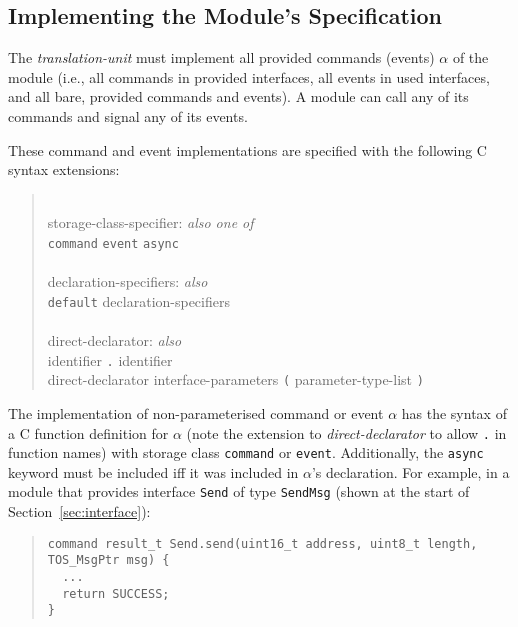 \documentclass[11pt,letterpaper]{article}
\newcommand{\kw}[1]{{\tt #1}}
\newcommand{\code}[1]{{\tt #1}}
\newcommand{\grammarshift}{\vspace*{-.7cm}}
\newcommand{\grammarindent}{\hspace*{2cm}\= \\ \kill}
\begin{document}
\subsection{Implementing the Module's Specification}

The \emph{translation-unit} must implement all provided commands
(events) $\alpha$ of the module (i.e., all commands in provided
interfaces, all events in used interfaces, and all bare, provided
commands and events). A module can call any of its commands and
signal any of its events.

These command and event implementations are specified with the following C
syntax extensions:
\begin{quote} \grammarshift \em \begin{tabbing}
\grammarindent
storage-class-specifier: \emph{also one of}\\
\>	\kw{command} \kw{event} \kw{async}\\
\\
declaration-specifiers: \emph{also}\\
\>	\kw{default} declaration-specifiers\\
\\
direct-declarator: \emph{also}\\
\>	identifier \kw{.} identifier \\
\>	direct-declarator interface-parameters \kw{(} parameter-type-list \kw{)}\\
\end{tabbing} \end{quote}
The implementation of non-parameterised command or event $\alpha$ has the
syntax of a C function definition for $\alpha$ (note the extension to
\emph{direct-declarator} to allow \code{.} in function names) with storage
class \kw{command} or \kw{event}. Additionally, the \kw{async} keyword must
be included iff it was included in $\alpha$'s declaration. For example, in
a module that provides interface \code{Send} of type \kw{SendMsg} (shown at
the start of Section~\ref{sec:interface}):
\begin{quote} \begin{verbatim}
command result_t Send.send(uint16_t address, uint8_t length, TOS_MsgPtr msg) {
  ...
  return SUCCESS;
}
\end{verbatim} \end{quote}
\end{document}
